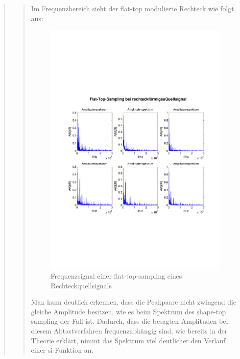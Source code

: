\begin{quote}
\begin{quote}
      	    Im Frequenzbereich sieht der flat-top modulierte Rechteck wie folgt
      	    aus:
      	    
      	    \begin{figure}[H]
            \centering
            \includegraphics[scale=0.6, trim = 1.5cm 6cm 1cm 8cm,
            clip]{./Bilder/flat-top-recht_freq}
                \caption{Frequenzsignal einer flat-top-sampling eines Rechteckquellsignals}
      	    \end{figure}
      	    
      	    Man kann deutlich erkennen, dass die Peakpaare nicht zwingend die
        	gleiche Amplitude besitzen, wie es beim Spektrum des shape-top sampling
        	der Fall ist. Dadurch, dass die besagten Amplituden bei diesem
        	Abtastverfahren frequenzabhängig sind, wie bereits in der Theorie
        	erklärt, nimmt das Spektrum viel deutlicher den Verlauf einer
        	si-Funktion an.\\
      	    

\end{quote}
\end{quote}
